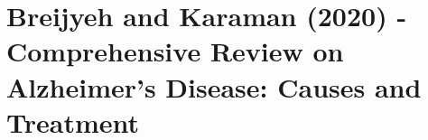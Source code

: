 \section*{Breijyeh and Karaman (2020) - Comprehensive Review on Alzheimer's Disease: Causes and Treatment}



